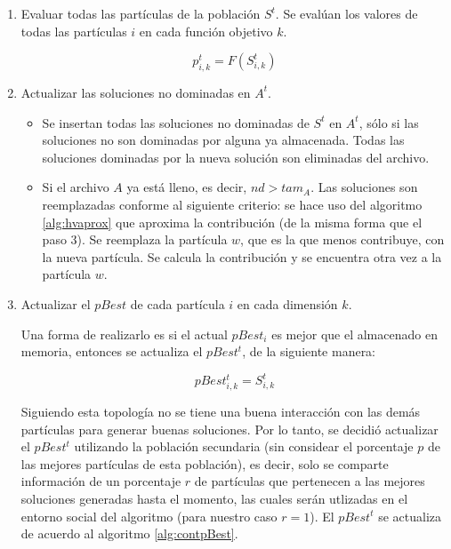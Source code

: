 \begin{enumerate}
\begin{enumerate}
\begin{itemize}
  \end{itemize}

  \item Evaluar todas las part\'iculas de la poblaci\'on $S^t$. Se eval\'uan los valores de 
     todas las part\'iculas $i$ en cada funci\'on objetivo $k$. 

      \[p^t_{i,k} = F \left(S^t_{i,k} \right)\] 

  \item Actualizar las soluciones no dominadas en $A^t$. 

  \begin{itemize}
   \item Se insertan todas las soluciones no dominadas de $S^t$ en $A^t$, s\'olo si las soluciones no son 
  dominadas por alguna ya almacenada. Todas las soluciones dominadas por la nueva soluci\'on son eliminadas del archivo. 

  \item Si el archivo $A$ ya est\'a lleno, es decir, $nd > tam_A$. Las soluciones son reemplazadas conforme al siguiente criterio: 
  se hace uso del algoritmo \ref{alg:hvaprox} que aproxima la contribuci\'on (de la misma forma que el paso $3$). Se reemplaza la 
  part\'icula $w$, que es la que menos contribuye, con la nueva part\'icula. Se calcula la contribuci\'on y
  se encuentra otra vez a la part\'icula $w$.

  \end{itemize}

  \item Actualizar el $pBest$ de cada part\'icula $i$ en cada dimensi\'on $k$. 

  Una forma de realizarlo es si el actual $pBest_i$ es mejor que el almacenado en memoria, entonces se actualiza el $pBest^t$, de la siguiente 
  manera:

  \[pBest^t_{i,k} = S^t_{i,k}\]

  Siguiendo esta topolog\'ia no se tiene una buena interacci\'on con las dem\'as part\'iculas para generar buenas soluciones. 
  Por lo tanto, se decidi\'o actualizar el $pBest^t$ utilizando la poblaci\'on secundaria (sin considear el porcentaje $p$ de 
  las mejores   part\'iculas de esta poblaci\'on), es decir, solo se comparte informaci\'on de un porcentaje $r$ de part\'iculas 
  que pertenecen a las mejores soluciones generadas hasta el momento, las cuales ser\'an utlizadas en el entorno social del 
  algoritmo (para nuestro caso $r=1$). El $pBest^t$ se actualiza de acuerdo al algoritmo \ref{alg:contpBest}.


\end{enumerate}
\end{enumerate}
